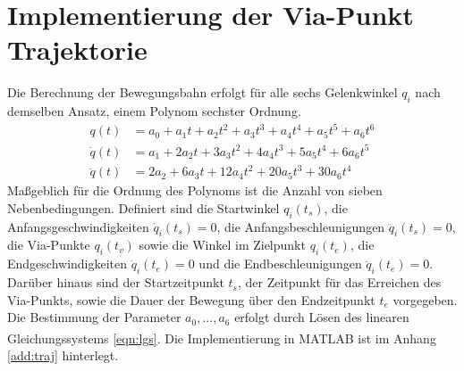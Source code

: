\chapter{Implementierung der Via-Punkt Trajektorie}
\label{cha:trajektorie}
\label{sec:trajektorie}
Die Berechnung der Bewegungsbahn erfolgt für alle sechs Gelenkwinkel $q_i$ nach demselben Ansatz, einem Polynom sechster Ordnung. 
%
\begin{align}
	q(t) &= a_0 + a_1t + a_2t^2 + a_3t^3 + a_4t^4 + a_5t^5  + a_6t^6 \\
	\dot{q}(t) &= a_1 + 2a_2t + 3a_3t^2 + 4a_4t^3 + 5a_5t^4  + 6a_6t^5\\
	\ddot{q}(t) &= 2a_2 + 6a_3t + 12a_4t^2 + 20a_5t^3  + 30a_6t^4
\end{align}
%
Maßgeblich für die Ordnung des Polynoms ist die Anzahl von sieben Nebenbedingungen.  Definiert sind die Startwinkel $q_i(t_s)$, die Anfangsgeschwindigkeiten $\dot{q}_i(t_s) = 0$, die Anfangsbeschleunigungen $\ddot{q}_i(t_s) = 0$, die Via-Punkte $q_i(t_v)$ sowie die Winkel im Zielpunkt $q_i(t_e)$, die Endgeschwindigkeiten $\dot{q}_i(t_e) = 0$ und die Endbeschleunigungen $\ddot{q}_i(t_e) = 0$. Darüber hinaus sind der Startzeitpunkt $t_s$, der Zeitpunkt für das Erreichen des Via-Punkts, sowie die Dauer der Bewegung über den Endzeitpunkt $t_e$ vorgegeben. 
%
Die Bestimmung der Parameter $a_0, ... ,a_6$ erfolgt durch Lösen des linearen Gleichungssystems \ref{eqn:lgs}. Die Implementierung in MATLAB\textsuperscript{\textregistered} ist im Anhang \ref{add:traj} hinterlegt.
%
